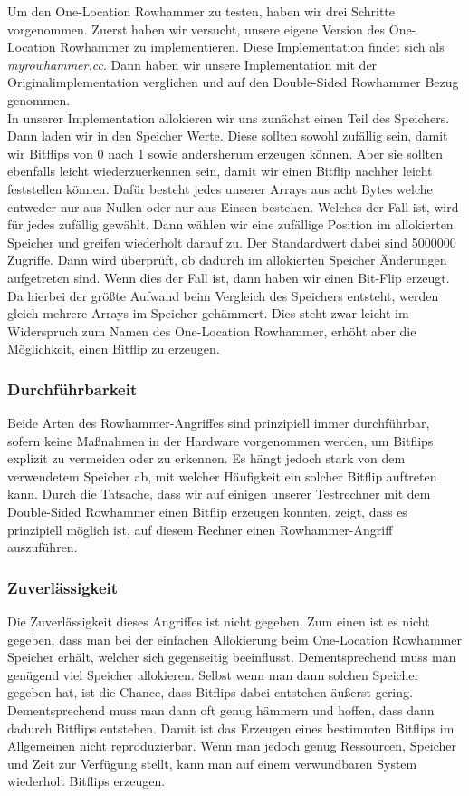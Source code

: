 Um den One-Location Rowhammer zu testen, haben wir drei Schritte vorgenommen. Zuerst haben wir versucht, unsere eigene Version des One-Location Rowhammer zu implementieren. Diese Implementation findet sich als \emph{myrowhammer.cc}. Dann haben wir unsere Implementation mit der Originalimplementation \cite{git-rowhammer} verglichen und auf den Double-Sided Rowhammer Bezug genommen.\\
In unserer Implementation allokieren wir uns zunächst einen Teil des Speichers. Dann laden wir in den Speicher Werte. Diese sollten sowohl zufällig sein, damit wir Bitflips von 0 nach 1 sowie andersherum erzeugen können. Aber sie sollten ebenfalls leicht wiederzuerkennen sein, damit wir einen Bitflip nachher leicht feststellen können. Dafür besteht jedes unserer Arrays aus acht Bytes welche entweder nur aus Nullen oder nur aus Einsen bestehen. Welches der Fall ist, wird für jedes zufällig gewählt.
Dann wählen wir eine zufällige Position im allokierten Speicher und greifen wiederholt darauf zu. Der Standardwert dabei sind 5000000 Zugriffe. Dann wird überprüft, ob dadurch im allokierten Speicher Änderungen aufgetreten sind. Wenn dies der Fall ist, dann haben wir einen Bit-Flip erzeugt. Da hierbei der größte Aufwand beim Vergleich des Speichers entsteht, werden gleich mehrere Arrays im Speicher gehämmert. Dies steht zwar leicht im Widerspruch zum Namen des One-Location Rowhammer, erhöht aber die Möglichkeit, einen Bitflip zu erzeugen.

\subsubsection{Durchführbarkeit}
Beide Arten des Rowhammer-Angriffes sind prinzipiell immer durchführbar, sofern keine Maßnahmen in der Hardware vorgenommen werden, um Bitflips explizit zu vermeiden oder zu erkennen. Es hängt jedoch stark von dem verwendetem Speicher ab, mit welcher Häufigkeit ein solcher Bitflip auftreten kann. Durch die Tatsache, dass wir auf einigen unserer Testrechner mit dem Double-Sided Rowhammer einen Bitflip erzeugen konnten, zeigt, dass es prinzipiell möglich ist, auf diesem Rechner einen Rowhammer-Angriff auszuführen.

\subsubsection{Zuverlässigkeit}
Die Zuverlässigkeit dieses Angriffes ist nicht gegeben. Zum einen ist es nicht gegeben, dass man bei der  einfachen Allokierung beim One-Location Rowhammer Speicher erhält, welcher sich gegenseitig beeinflusst. Dementsprechend muss man genügend viel Speicher allokieren. Selbst wenn man dann solchen Speicher gegeben hat, ist die Chance, dass Bitflips dabei entstehen äußerst gering. Dementsprechend muss man dann oft genug hämmern und hoffen, dass dann dadurch Bitflips entstehen. Damit ist das Erzeugen eines bestimmten Bitflips im Allgemeinen nicht reproduzierbar. Wenn man jedoch genug Ressourcen, Speicher und Zeit zur Verfügung stellt, kann man auf einem verwundbaren System wiederholt Bitflips erzeugen.

